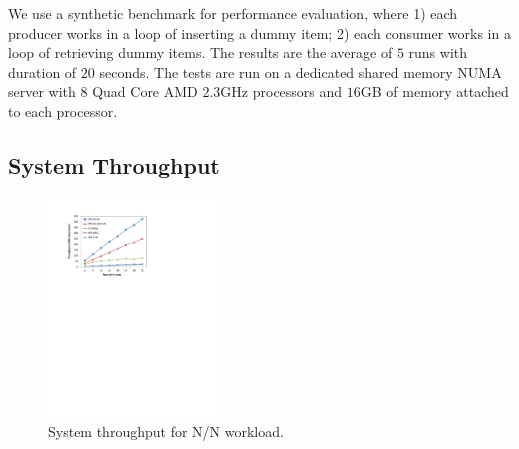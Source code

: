 We use a synthetic benchmark for performance evaluation, where 1) each producer works in a loop of inserting a dummy item; 2) each consumer works in a loop of retrieving dummy items. The results are the average of $5$ runs with duration of $20$ seconds. 
The tests are run on a dedicated shared memory NUMA server with $8$ Quad Core AMD $2.3$GHz processors and $16$GB of memory attached to each processor. 

\subsection{System Throughput}
\label{sec:eval-performance}

\begin{figure}[htb]
	\centering
	\includegraphics[width=0.40\textwidth]{figures/n-n-throughput}
  \caption{\footnotesize{System throughput for N/N workload. }}
	\label{fig:n-n-throughput}
\end{figure}

